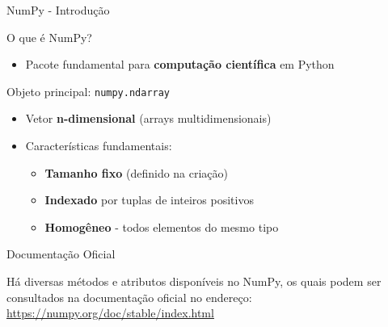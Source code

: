 \begin{frame}{NumPy - Introdução}

    \begin{block}{O que é NumPy?}
        \begin{itemize}
            \item Pacote fundamental para \textbf{computação científica} em Python


        \end{itemize}
    \end{block}

    \begin{block}{Objeto principal: \texttt{numpy.ndarray}}
        \begin{itemize}
            \item Vetor \textbf{n-dimensional} (arrays multidimensionais)
            \item Características fundamentais:
                  \begin{itemize}
                      \item \textbf{Tamanho fixo} (definido na criação)
                      \item \textbf{Indexado} por tuplas de inteiros positivos
                      \item \textbf{Homogêneo} - todos elementos do mesmo tipo
                  \end{itemize}
        \end{itemize}
    \end{block}

    \begin{exampleblock}{Documentação Oficial}
        \centering

        Há diversas métodos e atributos disponíveis no NumPy, os quais podem ser consultados na documentação oficial no endereço:
        \url{https://numpy.org/doc/stable/index.html}


    \end{exampleblock}


\end{frame}

